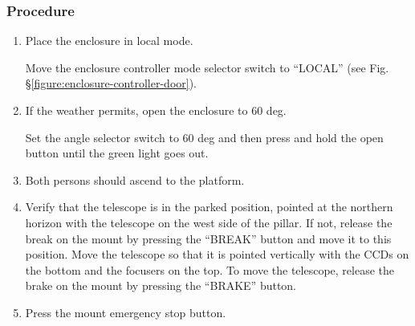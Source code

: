 \subsubsection{Procedure}

\begin{enumerate}

\item
Place the enclosure in local mode.

Move the enclosure controller mode selector switch to “LOCAL” (see Fig. \S\ref{figure:enclosure-controller-door}).
\item
If the weather permits, open the enclosure to 60 deg.

Set the angle selector switch to 60 deg and then press and hold the open button until the green light goes out.

\item
Both persons should ascend to the platform.

\item
\ifcoatlioan
Verify that the telescope is in the parked position, pointed at the northern horizon with the telescope on the west side of the pillar. If not, release the break on the mount by pressing the “BREAK” button and move it to this position.
\fi
\ifddotioan
Move the telescope so that it is pointed vertically with the CCDs on the bottom and the focusers on the top. To move the telescope, release the brake on the mount by pressing the “BRAKE” button.
\fi

\item
Press the mount emergency stop button.


\end{enumerate}
